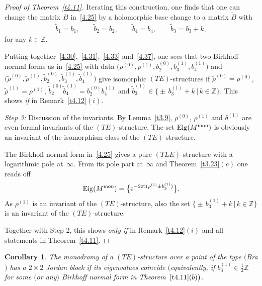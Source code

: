 \documentclass[10pt,a4paper]{amsart}
\numberwithin{equation}{section}
\numberwithin{figure}{section}
\newcommand{\Z}{{\mathbb Z}}
\newcommand{\www}{\widetilde}
\DeclareMathOperator{\Eig}{Eig}
\newtheorem{Corollary}[Theorem]{Corollary}
\begin{document}
\begin{proof}[Proof of Theorem~\ref{t4.11}]
Iterating this construction, one finds that one can
change the matrix $B$ in~\eqref{4.25} by a holomorphic
base change to a matrix $\www B$ with
\begin{gather}\label{4.37}
\www b_1=b_1,\qquad
\www b_2=b_2,\qquad
\www b_4=b_4,\qquad
\www b_3=b_3+k,
\end{gather}
for any $k\in\Z$.

Putting together~\eqref{4.30},~\eqref{4.31},~\eqref{4.33}
and~\eqref{4.37}, one sees that two Birkhoff normal forms
as in~\eqref{4.25}
with data $\big(\rho^{(0)},\rho^{(1)},b_2^{(0)},b_3^{(1)},b_4^{(1)}\big)$
and $\big(\www \rho^{(0)},\www \rho^{(1)},\www b_2^{(0)},\www b_3^{(1)},
\www b_4^{(1)}\big)$ give isomorphic $(TE)$-structures
if $\www \rho^{(0)}=\rho^{(0)}$, $\www\rho^{(1)}=\rho^{(1)}$,
$\www b_2^{(0)}\www b_4^{(1)}=b_2^{(0)} b_4^{(1)}$
and $\www b_3^{(1)}\in \big\{{\pm}\, b_3^{(1)}+k\,|\, k\in\Z\big\}$.
This shows {\it if} in Remark~\ref{t4.12}$(i)$.

\medskip\noindent
{\it Step 3:} Discussion of the invariants.
By Lemma~\ref{t3.9}, $\rho^{(0)}$, $\rho^{(1)}$ and $\delta^{(1)}$
are even formal inva\-ri\-ants of the $(TE)$-structure.
The set $\Eig(M^{\rm mon})$ is obviously an invariant of the
isomorphism class of the $(TE)$-structure.

The Birkhoff normal form in~\eqref{4.25} gives a pure
$(TLE)$-structure with a logarithmic pole at~$\infty$.
From its pole part at~$\infty$
and Theorem~\ref{t3.23}$(c)$ one reads off
\begin{gather*}%
\Eig(M^{\rm mon})=\big\{{\rm e}^{-2\pi {\rm i}(\rho^{(1)}\pm b_3^{(1)})}\big\}.
\end{gather*}
As $\rho^{(1)}$ is an invariant of the $(TE)$-structure,
also the set $\big\{{\pm}\, b_3^{(1)}+k\,|\, k\in\Z\big\}$
is an invariant of the $(TE)$-structure.

Together with Step 2, this shows {\it only if} in
Remark~\ref{t4.12}$(i)$ and all statements in Theo\-rem~\ref{t4.11}.
\end{proof}


\begin{Corollary}%
The monodromy of a $(TE)$-structure over a point
of the type $($Bra$)$ has a $2\times 2$ Jordan block if its
eigenvalues coincide $\big($equivalently, if
$b_3^{(1)}\in\frac{1}{2}\Z$ for some $($or any$)$
Birkhoff normal form in Theorem~$\ref{t4.11}(b)\big)$.
\end{Corollary}
\end{document}
